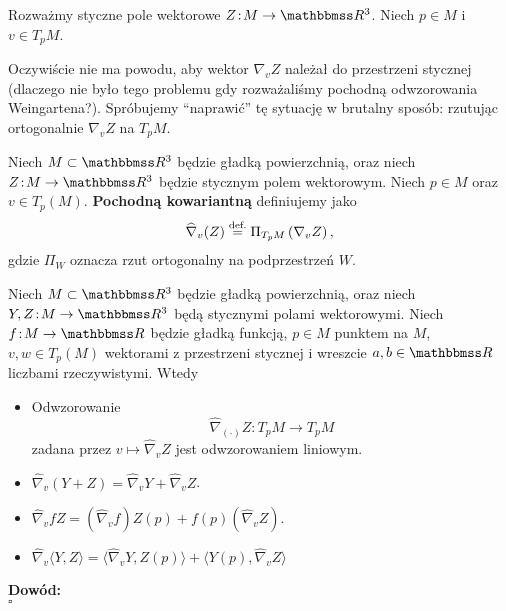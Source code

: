 \begin{frame}
 Rozważmy styczne pole wektorowe $Z\colon M\to \R^3$. Niech $p\in M$ i $v\in T_p M$. 

\pause Oczywiście nie ma powodu, aby wektor $\nabla_v Z$ należał do przestrzeni stycznej (dlaczego nie było tego problemu gdy rozważaliśmy pochodną odwzorowania Weingartena?). \pause Spróbujemy ``naprawić'' tę sytuację w brutalny sposób: rzutując ortogonalnie $\nabla_v Z$ na $T_p M$. %

\pause
 \begin{definicja}
 Niech $M\subset \R^3$ będzie gładką powierzchnią, oraz niech $Z\colon M\to \R^3$ będzie stycznym polem wektorowym. Niech $p\in M$ oraz $v\in T_p(M)$. \textbf{Pochodną kowariantną} definiujemy jako
 \[\widehat\nabla_v(Z)\define\Pi_{T_pM}\left(\nabla_vZ\right),\]gdzie $\Pi_W$ oznacza rzut ortogonalny na podprzestrzeń $W$.
 \end{definicja}
 \end{frame}
\begin{frame}

\begin{lemat}
  Niech $M\subset \R^3$ będzie gładką powierzchnią, oraz niech $Y, Z\colon M\to \R^3$ będą stycznymi polami wektorowymi. Niech $f\colon M\to \R$ będzie gładką funkcją, $p\in M$ punktem na $M$, $v,w\in T_p(M)$ wektorami z przestrzeni stycznej i wreszcie $a,b\in \R$ liczbami rzeczywistymi. Wtedy
 \begin{itemize}
  \item Odwzorowanie \[\widehat{\nabla}_{(\cdot)}Z\colon T_pM\to T_pM\] zadana przez $v\mapsto \widehat{\nabla}_vZ$ jest odwzorowaniem liniowym.
  \item $\widehat{\nabla}_v(Y+Z)=\widehat{\nabla}_vY+\widehat{\nabla}_v Z$.
  \item $\widehat{\nabla}_vfZ=(\widehat{\nabla}_v f)Z(p)+f(p)(\widehat{\nabla}_vZ)$.
 \item $\widehat{\nabla}_v\langle Y,Z\rangle=\langle\widehat{\nabla}_v Y, Z(p)\rangle+\langle Y(p),\widehat{\nabla}_v Z\rangle$
\end{itemize}
\end{lemat}

\pause \textcolor{ared}{\textbf{Dowód: }}\\
\hfill $\square$
\end{frame}

